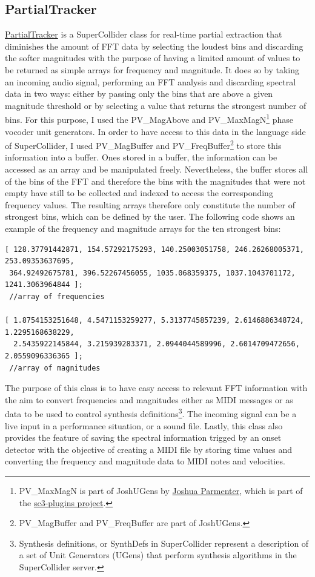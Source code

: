 \subsection{PartialTracker}

\href{http://github.com/freuben/FedeLib/blob/master/PartialTracking/PartialTracker.sc}{PartialTracker} is a SuperCollider class for real-time partial extraction that diminishes the amount of FFT data by selecting the loudest bins and discarding the softer magnitudes with the purpose of having a limited amount of values to be returned as simple arrays for frequency and magnitude. It does so by taking an incoming audio signal, performing an FFT analysis and discarding spectral data in two ways: either by passing only the bins that are above a given magnitude threshold or by selecting a value that returns the strongest number of bins. For this purpose, I used the PV\_MagAbove and PV\_MaxMagN\footnote{PV\_MaxMagN is part of JoshUGens by \href{http://www.realizedsound.net/josh/}{Joshua Parmenter}, which is part of the \href{http://sourceforge.net/projects/sc3-plugins/}{sc3-plugins project}.} phase vocoder unit generators. In order to have access to this data in the language side of SuperCollider, I used PV\_MagBuffer and PV\_FreqBuffer\footnote{PV\_MagBuffer and PV\_FreqBuffer are part of JoshUGens.} to store this information into a buffer. Ones stored in a buffer, the information can be accessed as an array and be manipulated freely. Nevertheless, the buffer stores all of the bins of the FFT and therefore the bins with the magnitudes that were not empty have still to be collected and indexed to access the corresponding frequency values. The resulting arrays therefore only constitute the number of strongest bins, which can be defined by the user. The following code shows an example of the frequency and magnitude arrays for the ten strongest bins:

\begin{verbatim}
[ 128.37791442871, 154.57292175293, 140.25003051758, 246.26268005371, 253.09353637695,
 364.92492675781, 396.52267456055, 1035.068359375, 1037.1043701172, 1241.3063964844 ]; 
 //array of frequencies

[ 1.8754153251648, 4.5471153259277, 5.3137745857239, 2.6146886348724, 1.2295168638229,
  2.5435922145844, 3.215939283371, 2.0944044589996, 2.6014709472656, 2.0559096336365 ]; 
 //array of magnitudes
\end{verbatim}
The purpose of this class is to have easy access to relevant FFT information with the aim to convert frequencies and magnitudes either as MIDI messages or as data to be used to control synthesis definitions\footnote{Synthesis definitions, or SynthDefs in SuperCollider represent a description of a set of Unit Generators (UGens) that perform synthesis algorithms in the SuperCollider server.}. The incoming signal can be a live input in a performance situation, or a sound file. Lastly, this class also provides the feature of saving the spectral information trigged by an onset detector with the objective of  creating a MIDI file by storing time values and converting the frequency and magnitude data to MIDI notes and velocities.

